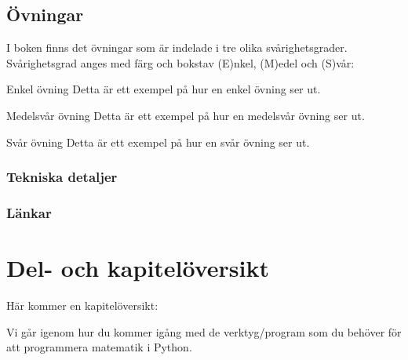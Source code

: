 \subsection{Övningar}
I boken finns det övningar som är indelade i tre olika svårighetsgrader. Svårighetsgrad anges med färg och bokstav (E)nkel, (M)edel och (S)vår:

\begin{matteovning}{Enkel övning}{}
Detta är ett exempel på hur en enkel övning ser ut.
\end{matteovning}

\begin{matteovningm}{Medelsvår övning}{}
Detta är ett exempel på hur en medelsvår övning ser ut.
\end{matteovningm}

\begin{matteovnings}{Svår övning}{}
Detta är ett exempel på hur en svår övning ser ut.
\end{matteovnings}

\subsubsection{Tekniska detaljer}

\subsubsection{Länkar}

\section{Del- och kapitelöversikt}
Här kommer en kapitelöversikt:


\vspace{20pt}

\begin{addmargin}[1.7em]{1.7em}%


Vi går igenom hur du kommer igång med de verktyg/program som du behöver för att programmera matematik i Python.

\end{addmargin}


